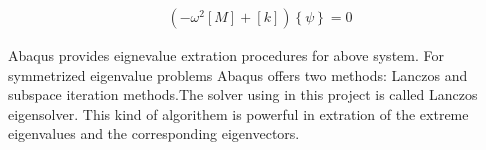 \documentclass[paper=a4, fontsize=11pt]{scrartcl} %
\numberwithin{equation}{section} %
\numberwithin{figure}{section} %
\numberwithin{table}{section} %
\begin{document}
\begin{align}
\left(-\omega^2\left[M\right]+\left[k\right]\right)\left\{\psi\right\}=0
\end{align}

Abaqus provides eignevalue extration procedures for above system. For
symmetrized eigenvalue problems Abaqus offers two methods: Lanczos and
subspace iteration methods.The solver using in this project is called
Lanczos eigensolver. This kind of algorithem is powerful in extration
of the extreme eigenvalues and the corresponding eigenvectors.
\end{document}
